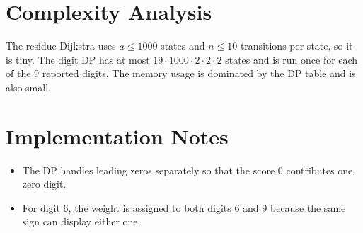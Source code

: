 \documentclass[11pt]{article}
\begin{document}
\section*{Complexity Analysis}

The residue Dijkstra uses $a \le 1000$ states and $n \le 10$ transitions per state, so it is tiny.
The digit DP has at most $19 \cdot 1000 \cdot 2 \cdot 2 \cdot 2$ states and is run once for each of the
$9$ reported digits. The memory usage is dominated by the DP table and is also small.

\section*{Implementation Notes}

\begin{itemize}[leftmargin=*]
    \item The DP handles leading zeros separately so that the score $0$ contributes one zero digit.
    \item For digit $6$, the weight is assigned to both digits $6$ and $9$ because the same sign can display
    either one.
\end{itemize}
\end{document}

